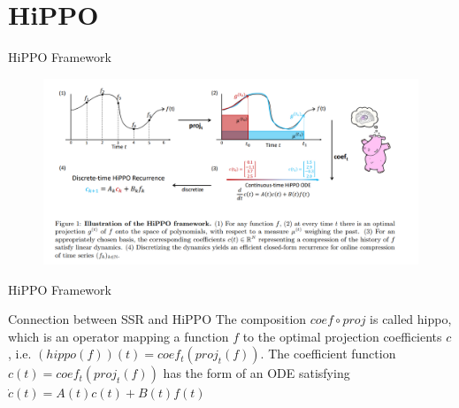 \documentclass{beamer}
\begin{document}
\section{HiPPO}

\begin{frame}{HiPPO Framework}
    \begin{figure}
        \centering
        \includegraphics[scale=0.25]{hippo.png}
    \end{figure}
\end{frame}

\begin{frame}{HiPPO Framework}
    \begin{block}{Connection between SSR and HiPPO}
        The composition $coef \circ proj$ is called hippo, which is an operator mapping a function $f$ to the optimal projection coefficients $c$, i.e. $(hippo(f))(t) = coef_t(proj_t(f))$. The coefficient function $c(t) = coef_t(proj_t(f))$ has the form of an ODE satisfying $\dot{c}(t) = A(t)c(t) + B(t)f(t)$
    \end{block}
    
\end{frame}
\end{document}
